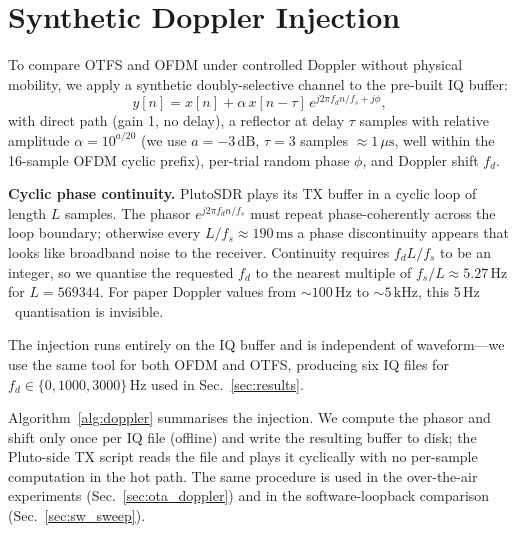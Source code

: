 \documentclass[conference,10pt]{IEEEtran}
\newcommand{\fd}{f_d}
\newcommand{\dB}{\ensuremath{\,\mathrm{dB}}}
\newcommand{\Hz}{\ensuremath{\,\mathrm{Hz}}}
\newcommand{\kHz}{\ensuremath{\,\mathrm{kHz}}}
\begin{document}
\section{Synthetic Doppler Injection}
\label{sec:injection}

To compare OTFS and OFDM under controlled Doppler without physical mobility, we apply a synthetic doubly-selective channel to the pre-built IQ buffer:
\begin{equation}
  y[n] = x[n] + \alpha\, x[n-\tau]\, e^{j 2\pi \fd n / f_s + j\phi},
  \label{eq:channel}
\end{equation}
with direct path (gain 1, no delay), a reflector at delay $\tau$ samples with relative amplitude $\alpha = 10^{a/20}$ (we use $a = -3\dB$, $\tau = 3$ samples $\approx 1\,\mu\mathrm{s}$, well within the 16-sample OFDM cyclic prefix), per-trial random phase $\phi$, and Doppler shift $\fd$.

\textbf{Cyclic phase continuity.} PlutoSDR plays its TX buffer in a cyclic loop of length $L$ samples. The phasor $e^{j 2\pi \fd n / f_s}$ must repeat phase-coherently across the loop boundary; otherwise every $L/f_s \approx 190\,\mathrm{ms}$ a phase discontinuity appears that looks like broadband noise to the receiver. Continuity requires $\fd L / f_s$ to be an integer, so we quantise the requested $\fd$ to the nearest multiple of $f_s / L \approx 5.27\Hz$ for $L = 569344$. For paper Doppler values from $\sim 100\Hz$ to $\sim 5\kHz$, this 5\Hz\ quantisation is invisible.

The injection runs entirely on the IQ buffer and is independent of waveform---we use the same tool for both OFDM and OTFS, producing six IQ files for $\fd \in \{0, 1000, 3000\}\Hz$ used in Sec.~\ref{sec:results}.

Algorithm~\ref{alg:doppler} summarises the injection. We compute the phasor and shift only once per IQ file (offline) and write the resulting buffer to disk; the Pluto-side TX script reads the file and plays it cyclically with no per-sample computation in the hot path. The same procedure is used in the over-the-air experiments (Sec.~\ref{sec:ota_doppler}) and in the software-loopback comparison (Sec.~\ref{sec:sw_sweep}).
\end{document}
